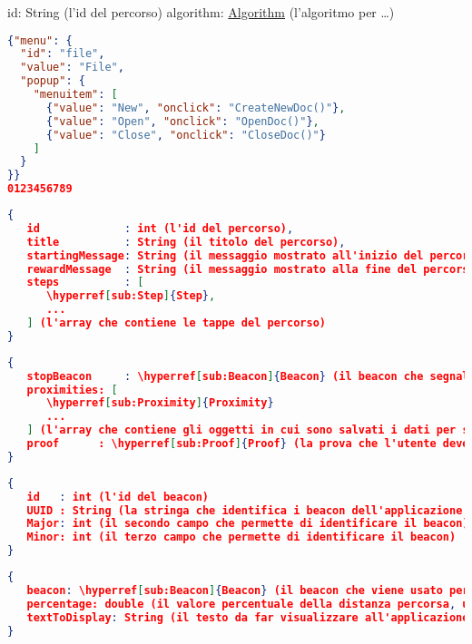 {
   id: String (l'id del percorso)
   algorithm: \hyperref[sub:Algorithm]{Algorithm} (l'algoritmo per …)
}


\begin{lstlisting}[language=json,firstnumber=1]
{"menu": {
  "id": "file",
  "value": "File",
  "popup": {
    "menuitem": [
      {"value": "New", "onclick": "CreateNewDoc()"},
      {"value": "Open", "onclick": "OpenDoc()"},
      {"value": "Close", "onclick": "CloseDoc()"}
    ]
  }
}}
0123456789
\end{lstlisting}

\begin{lstlisting}[language=json,firstnumber=1]
{
   id             : int (l'id del percorso),
   title          : String (il titolo del percorso),
   startingMessage: String (il messaggio mostrato all'inizio del percorso),
   rewardMessage  : String (il messaggio mostrato alla fine del percorso),
   steps          : [
      \hyperref[sub:Step]{Step},
      ...
   ] (l'array che contiene le tappe del percorso)
}
\end{lstlisting}

\begin{lstlisting}[language=json,firstnumber=1]
{
   stopBeacon     : \hyperref[sub:Beacon]{Beacon} (il beacon che segnala la posizione della tappa)
   proximities: [
      \hyperref[sub:Proximity]{Proximity}
      ...
   ] (l'array che contiene gli oggetti in cui sono salvati i dati per segnalare all'utente la distanza che manca per raggiungere questa stazione)
   proof      : \hyperref[sub:Proof]{Proof} (la prova che l'utente deve affrontare quando raggiunge la stazione)
}
\end{lstlisting}

\begin{lstlisting}[language=json,firstnumber=1]
{
   id   : int (l'id del beacon)
   UUID : String (la stringa che identifica i beacon dell'applicazione o i beacon dell'edificio, è il primo campo che permette di identificare il beacon)
   Major: int (il secondo campo che permette di identificare il beacon)
   Minor: int (il terzo campo che permette di identificare il beacon)
}
\end{lstlisting}

\begin{lstlisting}[language=json,firstnumber=1]
{
   beacon: \hyperref[sub:Beacon]{Beacon} (il beacon che viene usato per comunicare all'utente quanto è vicino alla stazione cercata)
   percentage: double (il valore percentuale della distanza percorsa, utile per una rappresentazione grafica della distanza che manca)
   textToDisplay: String (il testo da far visualizzare all'applicazione per informare l'utente se si sta avvicinando e quanto è distante)
}
\end{lstlisting}
